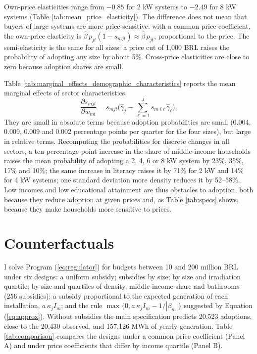 \documentclass[final,3p,times,authoryear]{elsarticle}
\begin{document}
    Own-price elasticities range from $-0.85$ for 2 kW systems to $-2.49$ for 8 kW systems (Table \ref{tab:mean_price_elasticity}). The difference does not mean that buyers of large systems are more price sensitive: with a common price coefficient, the own-price elasticity is $\hat\beta\, p_{jt}(1-s_{mjt}) \approx \hat\beta\, p_{jt}$, proportional to the price. The semi-elasticity is the same for all sizes: a price cut of 1,000 BRL raises the probability of adopting any size by about 5\%. Cross-price elasticities are close to zero because adoption shares are small.

    Table \ref{tab:marginal_effects_demographic_characteristics} reports the mean marginal effects of sector characteristics,
    \begin{equation}
        \label{eq:marginal_effect_demographics}
        \frac{\partial s_{mjt}}{\partial w_{mt}} = s_{mjt} \Big(\hat{\gamma}_{j} - \sum_{\ell=1}^{J} s_{m\ell t}\, \hat{\gamma}_{\ell}\Big).
    \end{equation}
    They are small in absolute terms because adoption probabilities are small (0.004, 0.009, 0.009 and 0.002 percentage points per quarter for the four sizes), but large in relative terms. Recomputing the probabilities for discrete changes in all sectors, a ten-percentage-point increase in the share of middle-income households raises the mean probability of adopting a 2, 4, 6 or 8 kW system by 23\%, 35\%, 17\% and 10\%; the same increase in literacy raises it by 71\% for 2 kW and 14\% for 4 kW systems; one standard deviation more density reduces it by 52--58\%. Low incomes and low educational attainment are thus obstacles to adoption, both because they reduce adoption at given prices and, as Table \ref{tab:specs} shows, because they make households more sensitive to prices.

    

\section{Counterfactuals}
\label{Counterfactuals}

    I solve Program (\ref{eq:regulator}) for budgets between 10 and 200 million BRL under six designs: a uniform subsidy; subsidies by size; by size and irradiation quartile; by size and quartiles of density, middle-income share and bathrooms (256 subsidies); a subsidy proportional to the expected generation of each installation, $a\, \kappa_j I_m$; and the rule $\max\{0, a\, \kappa_j I_m - 1/|\beta_m|\}$ suggested by Equation (\ref{eq:approx}). Without subsidies the main specification predicts 20,523 adoptions, close to the 20,430 observed, and 157,126 MWh of yearly generation. Table \ref{tab:comparison} compares the designs under a common price coefficient (Panel A) and under price coefficients that differ by income quartile (Panel B).
\end{document}
